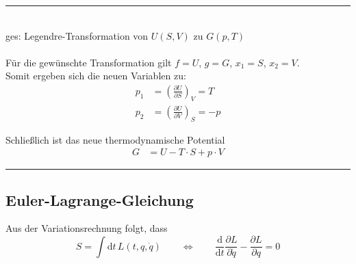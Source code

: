 \documentclass{article}
\newcommand{\diff}{\mathrm{d}}
\newcommand{\lr}[1]{\left(#1\right)}
\newcommand{\commenttext}[1]{\textcolor{gruen}{\text{#1}}}
\begin{document}
{\color{blue}
\hrule
	\\
%
%	
	ges: Legendre-Transformation von $U(S,V)$ zu $G(p,T)$\\
	\\
	Für die gewünschte Transformation gilt $f=U$, $g=G$, $x_1 = S$, $x_2 = V$.\\
	Somit ergeben sich die neuen Variablen zu:
		\begin{align*}
			p_1 &= \lr{ \frac{\partial U}{\partial S} }_V = T \\
			p_2 &= \lr{ \frac{\partial U}{\partial V} }_S = -p
		\end{align*}
	
	Schließlich ist das neue thermodynamische Potential
		\begin{align*}
			G &= U - T\cdot S + p\cdot V
		\end{align*}
\hrule
}


\newpage


\subsection{Euler-Lagrange-Gleichung}
Aus der Variationsrechnung folgt, dass
	\begin{equation}
		S = \int \diff t\, L(t, q,\dot{q}) \qquad \Leftrightarrow \qquad \frac{\diff}{\diff t} \frac{\partial L}{\partial \dot{q}} - \frac{\partial L}{\partial q} = 0
	\end{equation}

\vspace{0.5cm}
\end{document}
